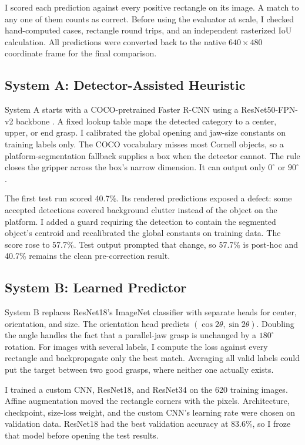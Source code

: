 \documentclass[10pt,conference]{IEEEtran}
\begin{document}
I scored each prediction against every positive rectangle on its image. A
match to any one of them counts as correct. Before using the evaluator at
scale, I checked hand-computed cases, rectangle round trips, and an independent
rasterized IoU calculation. All predictions were converted back to the native
$640\times480$ coordinate frame for the final comparison.

\subsection{System A: Detector-Assisted Heuristic}

System A starts with a COCO-pretrained Faster R-CNN using a
ResNet50-FPN-v2 backbone \cite{ren2015}. A fixed lookup table maps the detected
category to a center, upper, or end grasp. I calibrated the global opening and
jaw-size constants on training labels only. The COCO vocabulary misses most
Cornell objects, so a platform-segmentation fallback supplies a box when the
detector cannot. The rule closes the gripper across the box's narrow
dimension. It can output only $0^\circ$ or $90^\circ$.

The first test run scored 40.7\%. Its rendered predictions exposed a defect:
some accepted detections covered background clutter instead of the object on
the platform. I added a guard requiring the detection to contain the
segmented object's centroid and recalibrated the global constants on training
data. The score rose to 57.7\%. Test output prompted that change, so 57.7\%
is post-hoc and 40.7\% remains the clean pre-correction result.

\subsection{System B: Learned Predictor}

System B replaces ResNet18's ImageNet classifier \cite{he2016} with separate
heads for center, orientation, and size. The orientation head predicts
$(\cos 2\theta,\sin 2\theta)$. Doubling the angle handles the fact that a
parallel-jaw grasp is unchanged by a $180^\circ$ rotation. For images with
several labels, I compute the loss against every rectangle and backpropagate
only the best match. Averaging all valid labels could put the target between
two good grasps, where neither one actually exists.

I trained a custom CNN, ResNet18, and ResNet34 on the 620 training images.
Affine augmentation moved the rectangle corners with the pixels. Architecture,
checkpoint, size-loss weight, and the custom CNN's learning rate were chosen
on validation data. ResNet18 had the best validation accuracy at 83.6\%, so I
froze that model before opening the test results.
\end{document}
